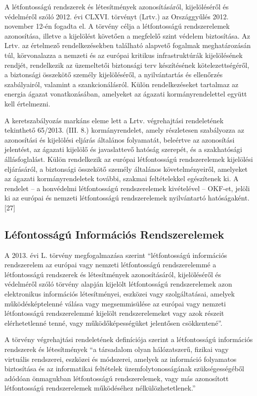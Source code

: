 \documentclass[12pt,magyar,a4paper,oneside]{scrreprt}
\begin{document}
A létfontosságú rendszerek és létesítmények azonosításáról,
kijelöléséről és védelméről szóló 2012. évi CLXVI. törvényt (Lrtv.) az
Országgyűlés 2012. november 12-én fogadta el. A törvény célja a
létfontosságú rendszerelemek azonosítása, illetve a kijelölést követően
a megfelelő szint védelem biztosítása. Az Lrtv. az értelmező
rendelkezésekben található alapvető fogalmak meghatározásán túl,
körvonalazza a nemzeti és az európai kritikus infrastruktúrák
kijelölésének rendjét, rendelkezik az üzemeltetői biztonsági terv
készítésének kötelezettségéről, a biztonsági összekötő személy
kijelöléséről, a nyilvántartás és ellenőrzés szabályairól, valamint a
szankcionálásról. Külön rendelkezéseket tartalmaz az energia ágazat
vonatkozásában, amelyeket az ágazati kormányrendelettel együtt kell
értelmezni.

A keretszabályozás markáns eleme lett a Lrtv. végrehajtási rendeletének
tekinthető 65/2013. (III. 8.) kormányrendelet, amely részletesen
szabályozza az azonosítási és kijelölési eljárás általános folyamatát,
beleértve az azonosítási jelentést, az ágazati kijelölő és javaslattevő
hatóság szerepét, és a szakhatósági állásfoglalást. Külön rendelkezik az
európai létfontosságú rendszerelemek kijelölési eljárásáról, a
biztonsági összekötő személy általános követelményeiről, amelyeket az
ágazati kormányrendeletek további, szakmai feltételekkel egészítenek ki.
A rendelet -- a honvédelmi létfontosságú rendszerelemek kivételével --
OKF-et, jelöli ki az európai és nemzeti létfontosságú rendszerelemek
nyilvántartó hatóságaként. {[}27{]}

\hypertarget{sec:LIRE}{%
\subsection{Léfontosságú Információs Rendszerelemek}\label{sec:LIRE}}

A 2013. évi L. törvény megfogalmazása szerint ``létfontosságú
információs rendszerelem az európai vagy nemzeti létfontosságú
rendszerelemmé a létfontosságú rendszerek és létesítmények
azonosításáról, kijelöléséről és védelméről szóló törvény alapján
kijelölt létfontosságú rendszerelemek azon elektronikus információs
létesítményei, eszközei vagy szolgáltatásai, amelyek működésképtelenné
válása vagy megsemmisülése az európai vagy nemzeti létfontosságú
rendszerelemmé kijelölt rendszerelemeket vagy azok részeit
elérhetetlenné tenné, vagy működőképességüket jelentősen csökkentené''.

A törvény végrehajtási rendeletének definíciója szerint a létfontosságú
információs rendszerek és létesítmények ``a társadalom olyan
hálózatszerű, fizikai vagy virtuális rendszerei, eszközei és módszerei,
amelyek az információ folyamatos biztosítása és az informatikai
feltételek üzemfolytonosságának szükségességéből adódóan önmagukban
létfontosságú rendszerelemek, vagy más azonosított létfontosságú
rendszerelemek működéséhez nélkülözhetetlenek.''
\end{document}
